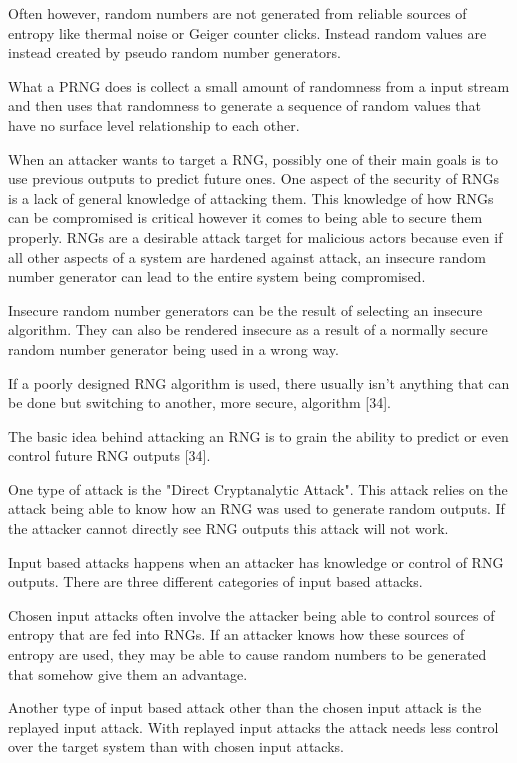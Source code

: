 \documentclass{article}
\begin{document}
    Often however, random numbers are not generated from reliable sources
    of entropy like thermal noise or Geiger counter clicks.
    Instead random values are instead created by pseudo random number generators.

    What a PRNG does is collect a small amount of randomness from a input stream
    and then uses that randomness to generate a sequence of random values that
    have no surface level relationship to each other.

    When an attacker wants to target a RNG, possibly one of their main goals
    is to use previous outputs to predict future ones.
    One aspect of the security of RNGs is a lack of general knowledge of
    attacking them. This knowledge of how RNGs can be compromised is critical however
    it comes to being able to secure them properly.
    RNGs are a desirable attack target for malicious actors because even if all
    other aspects of a system are hardened against attack, an insecure random
    number generator can lead to the entire system being compromised.

    Insecure random number generators can be the result of selecting an insecure algorithm.
    They can also be rendered insecure as a result of a normally secure random number
    generator being used in a wrong way.

    If a poorly designed RNG algorithm is used, there usually isn't anything that
    can be done but switching to another, more secure, algorithm [34].

    The basic idea behind attacking an RNG is to grain the ability to predict
    or even control future RNG outputs [34].

    One type of attack is the "Direct Cryptanalytic Attack". This attack
    relies on the attack being able to know how an RNG was used to generate
    random outputs.
    If the attacker cannot directly see RNG outputs this attack will not work.

    Input based attacks happens when an attacker has knowledge or control of RNG outputs.
    There are three different categories of input based attacks.
    
    Chosen input attacks often involve the attacker being able to control sources
    of entropy that are fed into RNGs. If an attacker knows how these
    sources of entropy are used, they may be able to cause random numbers
    to be generated that somehow give them an advantage.

    Another type of input based attack other than the chosen input attack is
    the replayed input attack. With replayed input attacks the attack
    needs less control over the target system than with chosen input attacks.
\end{document}
